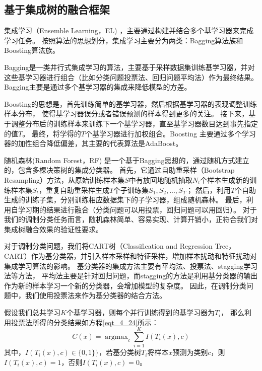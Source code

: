 \subsection{基于集成树的融合框架}
集成学习（Ensemble Learning，EL) ，主要通过构建并结合多个基学习器来完成学习任务。
按照算法的思想划分，集成学习主要分为两类：Bagging算法族和Boosting算法族\cite{周志华2016机器学习}。\par

Bagging\cite{breiman1996bagging}是一类井行式集成学习的算法，主要基于采样数据集训练基学习器，并对这些基学习器进行组合（比如分类问题投票法、回归问题平均法）作为最终结果。Bagging主要是通过多个基学习器的集成来降低模型的方差。

Boosting\cite{freund1999short}的思想是，首先训练简单的基学习器，然后根据基学习器的表现调整训练样本分布，
使得基学习器误分或者错误预测的样本得到更多的关注。
接下来，基于调整分布后的训练样本来训练下一个基学习器，直至基学习器数目达到事先指定的值$T$。
最终，将学得的$T$个基学习器进行加权组合。Boosting 主要通过多个学习器的加性组合降低偏差，其主要的代表算法是AdaBoost\cite{freund1996experiments}。\par

随机森林(Random Forest，RF) \cite{liaw2002classification}是一个基于Bagging思想的，通过随机方式建立的，包含多棵决策树的集成分类器。
首先，它通过自助重采样（Bootstrap Resampling）方法，从原始训练样本集$S$中有放回地随机抽取$N_t$个样本生成新的训练样本集$S_t$，重复自助重采样生成$T$个子训练集${S_1, S_2, ..., S_T}$；
然后，利用$T$个自助生成的训练子集，分别训练相应数据集下的子学习器，组成随机森林。
最后，利用自学习期的结果进行融合（分类问题可以用投票，回归问题可以用回归）。
对于我们的调制分类任务而言，随机森林简单、容易实现、计算开销小，正符合我们对集成树融合效果的验证性要求。\par

对于调制分类问题，我们将CART树（Classification and Regression Tree，CART）\cite{Breiman2015Classification}作为基分类器，并引入样本采样和特征采样，增加样本扰动和特征扰动对集成学习算法的影响。
基分类器的集成方法主要有平均法、投票法、stagging学习法等方法，
平均法主要是针对回归问题，而stagging的方法是利用基分类器的输出作为新的样本学习一个新的分类器，会增加模型的复杂度。
因此，在调制分类问题中，我们使用投票法来作为基分类器的结合方法。\par

假设我们总共学习$K$个基学习器，则每个并行训练得到的基学习器为$T_{i}$，
那么利用投票法所得的分类结果如方程\eqref{eqt_4_24}所示：
\begin{equation}
	\label{eqt_4_24}
	C(x) = \mathop{\arg\max}_{c} \sum_{i=1}^{K} I(T_i(x), c)
\end{equation}
其中，$I(T_i(x), c) \in \{0, 1\}\}$，若基分类树$T_{i}$将样本$x$预测为类别$c$，则$I(T_i(x), c)=1$，否则$I(T_i(x), c)=0$。\par

